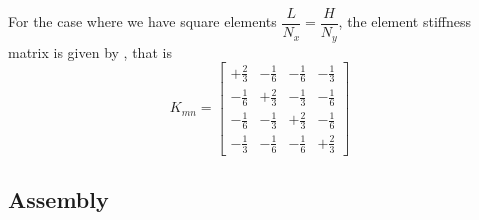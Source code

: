 For the case where we have square elements \ie
$\dfrac{L}{N_{x}}=\dfrac{H}{N_{y}}$, the element stiffness matrix is
given by , that
is
\begin{equation}
  K_{mn}=\begin{bmatrix}
  +\frac{2}{3} & -\frac{1}{6} & -\frac{1}{6} & -\frac{1}{3} \\
  -\frac{1}{6} & +\frac{2}{3} & -\frac{1}{3} & -\frac{1}{6} \\
  -\frac{1}{6} & -\frac{1}{3} & +\frac{2}{3} & -\frac{1}{6} \\
  -\frac{1}{3} & -\frac{1}{6} & -\frac{1}{6} & +\frac{2}{3}
  \end{bmatrix}
\end{equation}
 
\subsection{Assembly}
\label{subsec:FEMTwoDLaplaceAssembly}

